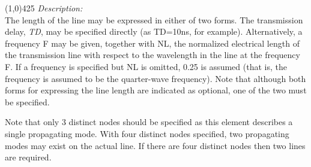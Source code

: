 \newline
\linethickness{0.5mm} \line(1,0){425}
\newline
\textit{Description:}\\
The length of the line may be expressed in either of two  forms.
The  transmission  delay,  {\it TD}, may be specified directly (as
TD=10ns, for example). Alternatively, a frequency F may  be given,
together with NL, the normalized electrical length of the
transmission line with respect to the wavelength in  the line at
the frequency F. If a frequency is specified but NL is omitted,
0.25 is  assumed (that is, the frequency is assumed to be the
quarter-wave frequency). Note that although both forms for
expressing the line length are indicated as optional, one of the
two must be specified.

Note that only 3 distinct nodes should be specified as this
element describes a single  propagating mode.  With four distinct
nodes specified, two propagating modes may exist on the actual
line.  If there are four distinct nodes then two lines are
required.

